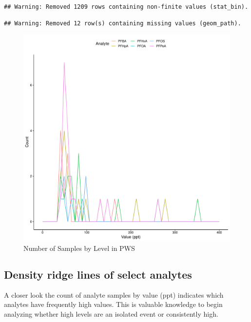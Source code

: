 \documentclass[
  12pt,
]{article}
\begin{document}
\begin{verbatim}
## Warning: Removed 1209 rows containing non-finite values (stat_bin).
\end{verbatim}

\begin{verbatim}
## Warning: Removed 12 row(s) containing missing values (geom_path).
\end{verbatim}

\begin{figure}

\includegraphics{PFAS_FinalProject_files/figure-latex/unnamed-chunk-5-1} \hfill{}

\caption{Number of Samples by Level in PWS}\label{fig:unnamed-chunk-5}
\end{figure}

\hypertarget{density-ridge-lines-of-select-analytes}{%
\subsection{Density ridge lines of select
analytes}\label{density-ridge-lines-of-select-analytes}}

A closer look the count of analyte samples by value (ppt) indicates
which analytes have frequently high values. This is valuable knowledge
to begin analyzing whether high levels are an isolated event or
consistently high.
\end{document}
